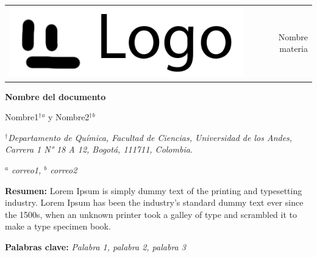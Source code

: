 \documentclass[11pt,fleqn]{article} %
\begin{document}
	\onehalfspacing %
	\setlength{\parskip}{0cm} %
	\setlength{\parindent}{0cm} %
	
	\begin{small}
		\begin{tabularx}{\textwidth}{Y r}
			& \\
			& \large \textcolor{Micolor}{Nombre materia} \\
			& 
		\end{tabularx}
	\end{small}
	
	\begin{flushleft}
		\textcolor{Micolor}{\Large \textbf{Nombre del documento}}
	\end{flushleft}

	Nombre1$^{\dag}$$^{a}$ y Nombre2$^{\dag}$$^{b}$
	
	\begin{small}
		\textit{$^{\dag}$Departamento de Química, Facultad de Ciencias, Universidad de los Andes, Carrera 1 N° 18 A 12, Bogotá, 111711, Colombia.}
		
		\textit{$^{a}$ correo1, $^{b}$ correo2}
		
		\linimg %
		
		\textcolor{Micolor}{\textbf{Resumen:}} Lorem Ipsum is simply dummy text of the printing and typesetting industry. Lorem Ipsum has been the industry's standard dummy text ever since the 1500s, when an unknown printer took a galley of type and scrambled it to make a type specimen book.  
	
		\textcolor{Micolor}{\textbf{Palabras clave:}} \textit{Palabra 1, palabra 2, palabra 3}
		
		\linimg
	\end{small}
	
	\setlength{\columnsep}{0.63cm} %
	
\end{document}
